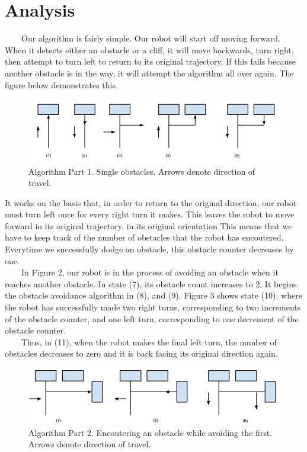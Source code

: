 \documentclass[10pt,titlepage]{article}
\begin{document}
  \section{Analysis}
  \ \ \ \ Our algorithm is fairly simple. Our robot will start off moving forward. When it detects either an obstacle or a cliff, it will move backwards, turn right, then attempt to turn left to return to its original trajectory. If this fails because another obstacle is in the way, it will attempt the algorithm all over again. The figure below demonstrates this. \\
    \begin{figure}[H]
        \includegraphics[keepaspectratio, width=1\textwidth]{../lab4_data/a.png}
        \caption{Algorithm Part 1. Single obstacles. Arrows denote direction of travel.}
    \end{figure}
  It works on the basis that, in order to return to the original direction, our robot must turn left once for every right turn it makes. This leaves the robot to move forward in its original trajectory. in its original orientation This means that we have to keep track of the number of obstacles that the robot has encoutered. Everytime we successfully dodge an obstacle, this obstacle counter decreases by one. \\
  \ \ \ \ In Figure 2,  our robot is in the process of avoiding an obstacle when it reaches another obstacle. In state (7), its obstacle count increases to 2. It begins the obstacle avoidance algorithm in (8), and (9). Figure 3 shows state (10), where the robot has successfully made two right turns, corresponding to two increments of the obstacle counter, and one left turn, corresponding to one decrement of the obstacle counter. \\
  \ \ \ \ Thus, in (11), when the robot makes the final left turn, the number of obstacles decreases to zero and it is back facing its original direction again.
    \begin{figure}[H]
        \includegraphics[keepaspectratio, width=1\textwidth]{../lab4_data/b.png}
        \caption{Algorithm Part 2. Encoutering an obstacle while avoiding the first. Arrows denote direction of travel.}
    \end{figure}
\end{document}
